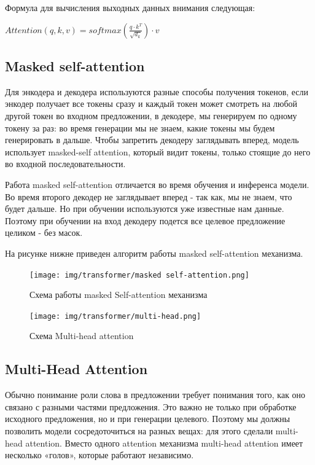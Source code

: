 \documentclass[PMI,VKR]{HSEUniversity}
\begin{document}
Формула для вычисления выходных данных внимания следующая:

\begin{center}
    $Attention(q, k, v) = softmax(\frac{q \cdot k^T}{\sqrt{d_k}}) \cdot v $
\end{center}

\subsection{Masked self-attention}

Для энкодера и декодера используются разные способы получения токенов, если энкодер получает все токены сразу и каждый токен может смотреть на любой другой токен во входном предложении, в декодере, мы генерируем по одному токену за раз: во время генерации мы не знаем, какие токены мы будем генерировать в дальше.
Чтобы запретить декодеру заглядывать вперед, модель использует masked-self attention, который видит токены, только стоящие до него во входной последовательности.

Работа masked self-attention отличается во время обучения и инференса модели. Во время второго декодер не заглядывает вперед - так как, мы не знаем, что будет дальше. Но при обучении используются уже известные нам данные. Поэтому при обучении на вход декодеру подется все целевое предложение целиком - без масок.

На рисунке нижне приведен алгоритм работы masked self-attention механизма.

\begin{figure}[h]
    \centering
    \texttt{[image: img/transformer/masked self-attention.png]}
    \caption{Схема работы masked Self-attention механизма}
\end{figure}

\begin{figure}[h]
    \centering
    \texttt{[image: img/transformer/multi-head.png]}
    \caption{Схема Multi-head attention}
\end{figure}

\subsection{Multi-Head Attention}

Обычно понимание роли слова в предложении требует понимания того, как оно связано с разными частями предложения. Это важно не только при обработке исходного предложения, но и при генерации целевого.
Поэтому мы должны позволить модели сосредоточиться на разных вещах: для этого сделали multi-head attention. Вместо одного attention механизма multi-head attention имеет несколько «голов», которые работают независимо.
\end{document}
